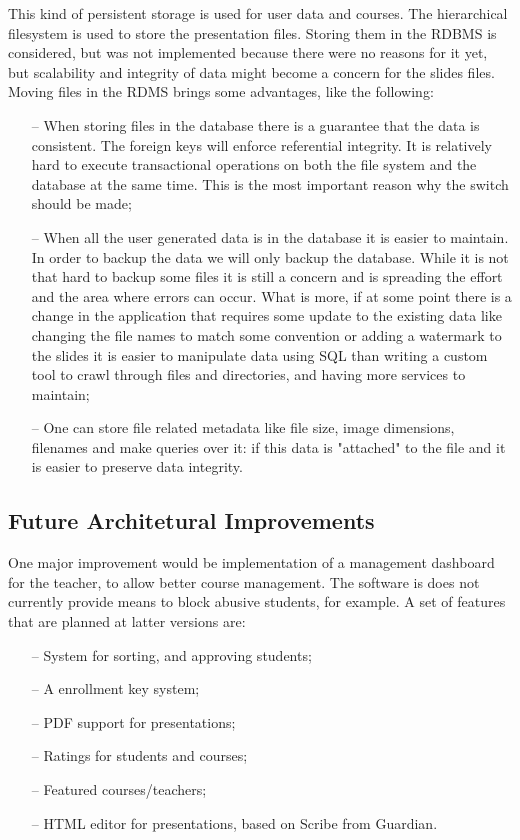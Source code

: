 This kind of persistent storage is used for user data and courses. The hierarchical filesystem is used to
store the presentation files. Storing them in the RDBMS is considered, but was not
implemented because there were no reasons for it yet, but scalability and integrity of
data might become a concern for the slides files.
Moving files in the RDMS brings some advantages, like the following:
\begin{enumerate}
    \item[--] When storing files in the database there is a guarantee that the data
        is consistent. The foreign keys will enforce referential integrity. It
        is relatively hard to execute transactional operations on both the file
        system and the database at the same time. This is the most important
        reason why the switch should be made;
    \item[--] When all the user generated data is in the database it is easier
        to maintain. In order to backup the data we will only backup the database.
        While it is not that hard to backup some files it is still a
        concern and is spreading the effort and the area where errors can occur.
        What is more, if at some point there is a change in
        the application that requires some update to the existing data like
        changing the file names to match some convention or adding a watermark
        to the slides it is easier to manipulate data using SQL than writing a
        custom tool to crawl through files and directories, and having more services
        to maintain;
    \item[--] One can store file related metadata like file size, image
        dimensions, filenames  and make queries over it:  if this data is
        "attached" to the file and it is easier to preserve data integrity.
\end{enumerate}

\subsection{Future Architetural Improvements}
One major improvement would be implementation of a management dashboard for the teacher, to allow better course
management. The software is does not currently provide means to block abusive students, for example. A set of
features that are planned at latter versions are:
\begin{enumerate}
    \item[--] System for sorting, and approving students;
    \item[--] A enrollment key system;
    \item[--] PDF support for presentations;
    \item[--] Ratings for students and courses;
    \item[--] Featured courses/teachers;
    \item[--] HTML editor for presentations, based on Scribe from Guardian.
\end{enumerate}

